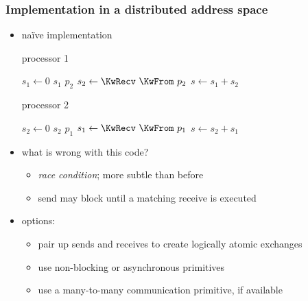\begin{frame}[fragile]
%
  \frametitle{Implementation in a distributed address space}
%
  \begin{itemize}
%
  \item na\"ive implementation

    \vspace{.5em}
    \begin{minipage}{.40\linewidth}
      \begin{algorithm}[H]
%
        \footnotesize
        \dontprintsemicolon
        \nocaptionofalgo
        \setalcaphskip{0ex}
%
        \caption{\hspace{1em}processor 1}
        \vspace{.5em}
%
        $s_{1} \leftarrow 0$ \;
        \KwSend $s_{1}$ \KwTo $p_{2}$ \;
        $s_{2} \leftarrow \KwRecv\ \KwFrom\ p_{2}$ \;
        $s \leftarrow s_{1}+s_{2}$ \;
%
        \vspace{.5em}
%
      \end{algorithm}
    \end{minipage}
%
    \hspace{.1\linewidth}
%
    \begin{minipage}{.40\linewidth}
      \begin{algorithm}[H]
%
        \footnotesize
        \dontprintsemicolon
        \nocaptionofalgo
        \setalcaphskip{0ex}
%
        \caption{\hspace{1em}processor 2}
        \vspace{.5em}
%
        $s_{2} \leftarrow 0$ \;
        \KwSend $s_{2}$ \KwTo $p_{1}$ \;
        $s_{1} \leftarrow \KwRecv\ \KwFrom\ p_{1}$ \;
        $s \leftarrow s_{2}+s_{1}$ \;
%
        \vspace{.5em}
      \end{algorithm}
    \end{minipage}
    \vspace{.5em}
%
  \item what is wrong with this code? 
%
    \begin{itemize}
    \item {\em race condition}; more subtle than before
    \item send may block until a matching receive is executed  
    \end{itemize}
  \item options:
    \begin{itemize}
    \item pair up sends and receives to create logically atomic exchanges
    \item use non-blocking or asynchronous primitives
    \item use a many-to-many communication primitive, if available
    \end{itemize}
%
  \end{itemize}
%
\end{frame}

